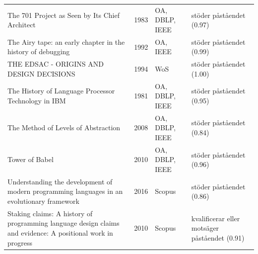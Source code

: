 \begin{longtable}{@{}%
  >{\raggedright\arraybackslash}p{}c%
  >{\raggedright\arraybackslash}p{}%
  >{\raggedright\arraybackslash}p{}@{}}
The 701 Project as Seen by Its Chief Architect & 1983 & OA, DBLP, IEEE & stöder påståendet (0.97) \\
The Airy tape: an early chapter in the history of debugging & 1992 & OA, IEEE & stöder påståendet (0.99) \\
THE EDSAC - ORIGINS AND DESIGN DECISIONS & 1994 & WoS & stöder påståendet (1.00) \\
The History of Language Processor Technology in IBM & 1981 & OA, DBLP, IEEE & stöder påståendet (0.95) \\
The Method of Levels of Abstraction & 2008 & OA, DBLP, IEEE & stöder påståendet (0.84) \\
Tower of Babel & 2010 & OA, DBLP, IEEE & stöder påståendet (0.96) \\
Understanding the development of modern programming languages in an evolutionary framework & 2016 & Scopus & stöder påståendet (0.86) \\
Staking claims: A history of programming language design claims and evidence: A positional work in progress & 2010 & Scopus & kvalificerar eller motsäger påståendet (0.91) \\
\end{longtable}
\endgroup
